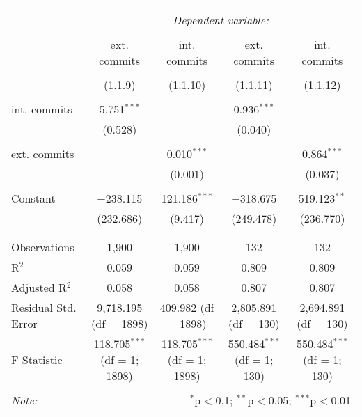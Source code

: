 
\begin{tabular}{@{\extracolsep{5pt}}lcccc}
\\[-1.8ex]\hline
\hline \\[-1.8ex]
 & \multicolumn{4}{c}{\textit{Dependent variable:}} \\
\cline{2-5}
\\[-1.8ex] & ext. commits & int. commits & ext. commits & int. commits \\
\\[-1.8ex] & (1.1.9) & (1.1.10) & (1.1.11) & (1.1.12)\\ 
\hline \\[-1.8ex]
 int. commits & 5.751$^{***}$ &  & 0.936$^{***}$ &  \\
  & (0.528) &  & (0.040) &  \\
  & & & & \\
 ext. commits &  & 0.010$^{***}$ &  & 0.864$^{***}$ \\
  &  & (0.001) &  & (0.037) \\
  & & & & \\
 Constant & $-$238.115 & 121.186$^{***}$ & $-$318.675 & 519.123$^{**}$ \\
  & (232.686) & (9.417) & (249.478) & (236.770) \\
  & & & & \\
\hline \\[-1.8ex]
Observations & 1,900 & 1,900 & 132 & 132 \\
R$^{2}$ & 0.059 & 0.059 & 0.809 & 0.809 \\
Adjusted R$^{2}$ & 0.058 & 0.058 & 0.807 & 0.807 \\
Residual Std. Error & 9,718.195 (df = 1898) & 409.982 (df = 1898) & 2,805.891 (df = 130) & 2,694.891 (df = 130) \\
F Statistic & 118.705$^{***}$ (df = 1; 1898) & 118.705$^{***}$ (df = 1; 1898) & 550.484$^{***}$ (df = 1; 130) & 550.484$^{***}$ (df = 1; 130) \\
\hline
\hline \\[-1.8ex]
\textit{Note:}  & \multicolumn{4}{r}{$^{*}$p$<$0.1; $^{**}$p$<$0.05; $^{***}$p$<$0.01} \\
\end{tabular}
